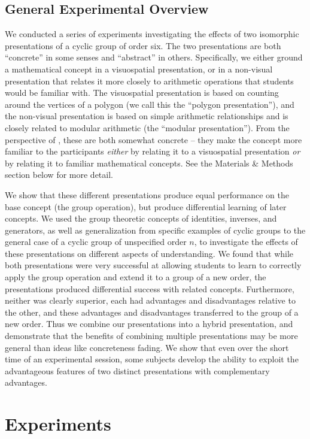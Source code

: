 \documentclass[man,10pt]{apa6}
\begin{document}
\subsection{General Experimental Overview}
We conducted a series of experiments investigating the effects of two isomorphic presentations of a cyclic group of order six. The two presentations are both ``concrete'' in some senses and ``abstract'' in others. Specifically, we either ground a mathematical concept in a visuospatial presentation, or in a non-visual presentation that relates it more closely to arithmetic operations that students would be familiar with. The visuospatial presentation is based on counting around the vertices of a polygon (we call this the ``polygon presentation''), and the non-visual presentation is based on simple arithmetic relationships and is closely related to modular arithmetic (the ``modular presentation''). From the perspective of , these are both somewhat concrete -- they make the concept more familiar to the participants \emph{either} by relating it to a visuospatial presentation \emph{or} by relating it to familiar mathematical concepts. See the Materials \& Methods section below for more detail. \par
We show that these different presentations produce equal performance on the base concept (the group operation), but produce differential learning of later concepts. We used the group theoretic concepts of identities, inverses, and generators, as well as generalization from specific examples of cyclic groups to the general case of a cyclic group of unspecified order $n$, to investigate the effects of these presentations on different aspects of understanding. We found that while both presentations were very successful at allowing students to learn to correctly apply the group operation and extend it to a group of a new order, the presentations produced differential success with related concepts. Furthermore, neither was clearly superior, each had advantages and disadvantages relative to the other, and these advantages and disadvantages transferred to the group of a new order. Thus we combine our presentations into a hybrid presentation, and demonstrate that the benefits of combining multiple presentations may be more general than ideas like concreteness fading. We show that even over the short time of an experimental session, some subjects develop the ability to exploit the advantageous features of two distinct presentations with complementary advantages. 
\section{Experiments}
\end{document}
